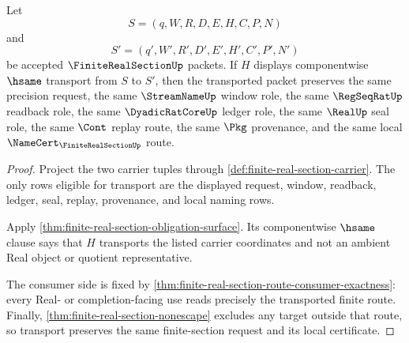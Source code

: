 \begin{theorem}
\label{thm:finite-real-section-transport-stability}
Let
$$
S=(q,W,R,D,E,H,C,P,N)
$$
and
$$
S'=(q',W',R',D',E',H',C',P',N')
$$
be accepted $\FiniteRealSectionUp$ packets. If $H$ displays componentwise $\hsame$ transport from $S$ to $S'$, then the transported packet preserves the same precision request, the same $\StreamNameUp$ window role, the same $\RegSeqRatUp$ readback role, the same $\DyadicRatCoreUp$ ledger role, the same $\RealUp$ seal role, the same $\Cont$ replay route, the same $\Pkg$ provenance, and the same local $\NameCert_{\FiniteRealSectionUp}$ route.
\end{theorem}
\begin{proof}
Project the two carrier tuples through \autoref{def:finite-real-section-carrier}. The only rows eligible for transport are the displayed request, window, readback, ledger, seal, replay, provenance, and local naming rows.

Apply \autoref{thm:finite-real-section-obligation-surface}. Its componentwise $\hsame$ clause says that $H$ transports the listed carrier coordinates and not an ambient Real object or quotient representative.

The consumer side is fixed by \autoref{thm:finite-real-section-route-consumer-exactness}: every Real- or completion-facing use reads precisely the transported finite route. Finally, \autoref{thm:finite-real-section-nonescape} excludes any target outside that route, so transport preserves the same finite-section request and its local certificate.
\end{proof}

